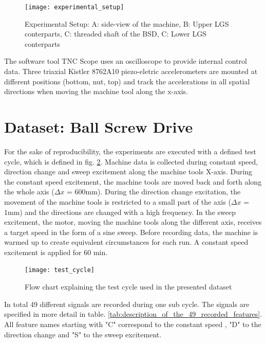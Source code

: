 \begin{figure}[H]
  \centering
  \texttt{[image: experimental\_setup]}
  \caption {Experimental Setup: A: side-view of the machine, B: Upper LGS conterparts, C: threaded shaft of the BSD, C: Lower LGS conterparts}
  \label{fig:experimental_setup}
\end{figure}

The software tool TNC Scope uses an oscilloscope to provide internal control data. Three triaxial Kistler 8762A10 piezo-eletric accelerometers are mounted at different positions (bottom, nut, top) and track the accelerations in all spatial directions when moving the machine tool along the x-axis.

\section{Dataset: Ball Screw Drive}
For the sake of reproducibility, the experiments are executed with a defined test cycle, which is defined in fig. \ref{fig:test_cycle}. Machine data is collected during constant speed, direction change and sweep excitement along the machine tools X-axis. During the constant speed excitement, the machine tools are moved back and forth along the whole axis ($\Delta x$ = 600mm). During the direction change excitation, the movement of the machine tools is restricted to a small part of the axis ($\Delta x$ = 1mm) and the directions are changed with a high frequency. In the sweep excitement, the motor, moving the machine tools along the different axis, receives a target speed in the form of a sine sweep. Before recording data, the machine is warmed up to create equivalent circumstances for each run. A constant speed excitement is applied for 60 min. 

\begin{figure}[H]
  \centering
  \texttt{[image: test\_cycle]}
  \caption {Flow chart explaining the test cycle used in the presented dataset}
  \label{fig:test_cycle}
\end{figure}

In total 49 different signals are recorded during one sub cycle. The signals are specified in more detail in table. \ref{tab:description_of_the_49_recorded_features}. All feature names starting with "C" correspond to the constant speed , "D" to the direction change and "S" to the sweep excitement.

